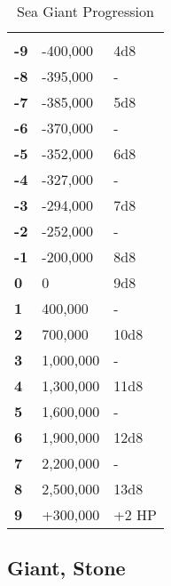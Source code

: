 \begin{multicols*}{2}
\begin {table}[H]
  \caption{Sea Giant Progression}
  \begin{tabularx}{\columnwidth}{>{\bfseries}YYY}
	 &  & \\
	-9 & -400,000 & 4d8\\
	-8 & -395,000 & -\\
	-7 & -385,000 & 5d8\\
	-6 & -370,000 & -\\
	-5 & -352,000 & 6d8\\
	-4 & -327,000 & -\\
	-3 & -294,000 & 7d8\\
	-2 & -252,000 & -\\
	-1 & -200,000 & 8d8\\
	0 & 0 & 9d8\\
	1 & 400,000 & -\\
	2 & 700,000 & 10d8\\
	3 & 1,000,000 & -\\
	4 & 1,300,000 & 11d8\\
	5 & 1,600,000 & -\\
	6 & 1,900,000 & 12d8\\
	7 & 2,200,000 & -\\
	8 & 2,500,000 & 13d8\\
	9 & +300,000 & +2 HP
  \end {tabularx}
\end {table}

\subsection{Giant, Stone}
\end{multicols*}
